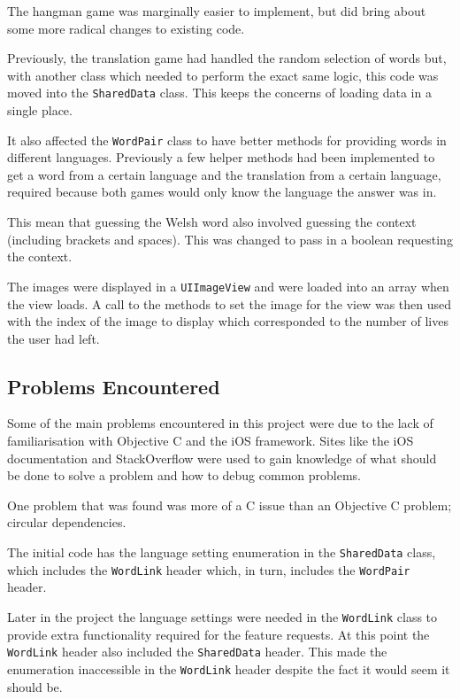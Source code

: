 \documentclass[11pt, a4paper]{article}
\begin{document}
The hangman game was marginally easier to implement, but did bring about some more radical changes to existing code.

Previously, the translation game had handled the random selection of words but, with another class which needed to perform the exact same logic, this code was moved into the \texttt{SharedData} class. This keeps the concerns of loading data in a single place.

It also affected the \texttt{WordPair} class to have better methods for providing words in different languages. Previously a few helper methods had been implemented to get a word from a certain language and the translation from a certain language, required because both games would only know the language the answer was in.

This mean that guessing the Welsh word also involved guessing the context (including brackets and spaces). This was changed to pass in a boolean requesting the context.

The images were displayed in a \texttt{UIImageView} and were loaded into an array when the view loads. A call to the methods to set the image for the view was then used with the index of the image to display which corresponded to the number of lives the user had left.

\subsection{Problems Encountered}

Some of the main problems encountered in this project were due to the lack of familiarisation with Objective C and the iOS framework. Sites like the iOS documentation and StackOverflow were used to gain knowledge of what should be done to solve a problem and how to debug common problems.

One problem that was found was more of a C issue than an Objective C problem; circular dependencies.

The initial code has the language setting enumeration in the \texttt{SharedData} class, which includes the \texttt{WordLink} header which, in turn, includes the \texttt{WordPair} header.

Later in the project the language settings were needed in the \texttt{WordLink} class to provide extra functionality required for the feature requests. At this point the \texttt{WordLink} header also included the \texttt{SharedData} header. This made the enumeration inaccessible in the \texttt{WordLink} header despite the fact it would seem it should be.
\end{document}
